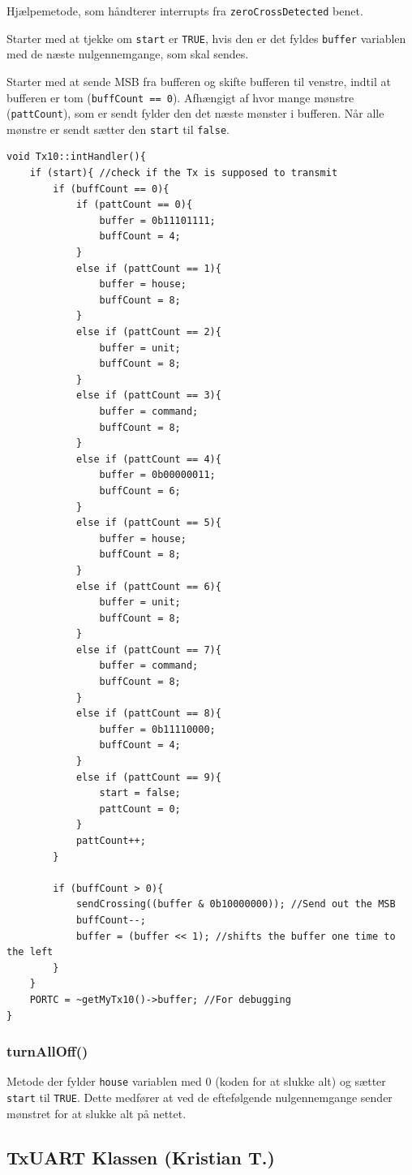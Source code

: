 Hjælpemetode, som håndterer interrupts fra \texttt{zeroCrossDetected} benet. 

Starter med at tjekke om \texttt{start} er \texttt{TRUE}, hvis den er det fyldes \texttt{buffer} variablen med de næste nulgennemgange, som skal sendes. 

Starter med at sende MSB fra bufferen og skifte bufferen til venstre, indtil at bufferen er tom (\texttt{buffCount == 0}). Afhængigt af hvor mange mønstre (\texttt{pattCount}), som er sendt fylder den det næste mønster i bufferen. Når alle mønstre er sendt sætter den \texttt{start} til \texttt{false}.

\begin{lstlisting}
void Tx10::intHandler(){
	if (start){ //check if the Tx is supposed to transmit
		if (buffCount == 0){
			if (pattCount == 0){
				buffer = 0b11101111;
				buffCount = 4;
			}
			else if (pattCount == 1){
				buffer = house;
				buffCount = 8;
			}
			else if (pattCount == 2){
				buffer = unit;
				buffCount = 8;
			}
			else if (pattCount == 3){
				buffer = command;
				buffCount = 8;
			}
			else if (pattCount == 4){
				buffer = 0b00000011;
				buffCount = 6;
			}
			else if (pattCount == 5){
				buffer = house;
				buffCount = 8;
			}
			else if (pattCount == 6){
				buffer = unit;
				buffCount = 8;
			}
			else if (pattCount == 7){
				buffer = command;
				buffCount = 8;
			}
			else if (pattCount == 8){
				buffer = 0b11110000;
				buffCount = 4;
			}
			else if (pattCount == 9){
				start = false;
				pattCount = 0;
			}
			pattCount++;
		}
		
		if (buffCount > 0){
			sendCrossing((buffer & 0b10000000)); //Send out the MSB
			buffCount--;
			buffer = (buffer << 1); //shifts the buffer one time to the left
		}
	}
	PORTC = ~getMyTx10()->buffer; //For debugging
}
\end{lstlisting}

\subsubsection{turnAllOff()}
Metode der fylder \texttt{house} variablen med 0 (koden for at slukke alt) og sætter \texttt{start} til \texttt{TRUE}. Dette medfører at ved de eftefølgende nulgennemgange sender mønstret for at slukke alt på nettet.

\subsection{TxUART Klassen (Kristian T.)} \label{TxUART}

